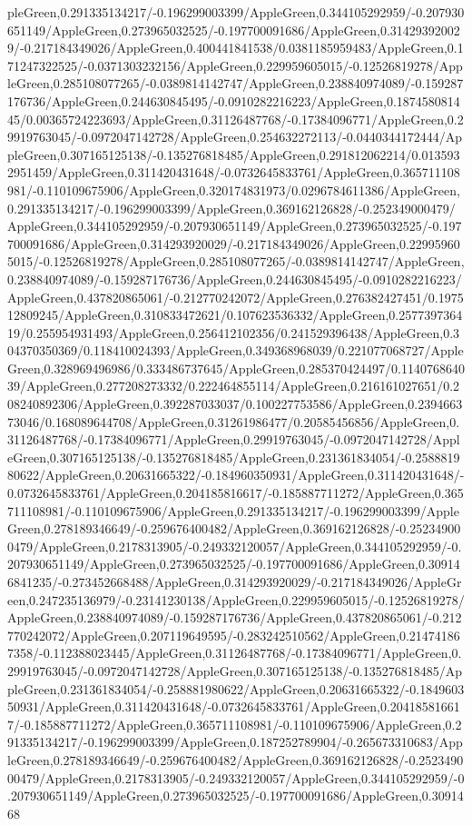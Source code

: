 {\begin{tikzternal}
{pleGreen,0.291335134217/-0.196299003399/AppleGreen,0.344105292959/-0.207930651149/AppleGreen,0.273965032525/-0.197700091686/AppleGreen,0.314293920029/-0.217184349026/AppleGreen,0.400441841538/0.0381185959483/AppleGreen,0.171247322525/-0.0371303232156/AppleGreen,0.229959605015/-0.12526819278/AppleGreen,0.285108077265/-0.0389814142747/AppleGreen,0.238840974089/-0.159287176736/AppleGreen,0.244630845495/-0.0910282216223/AppleGreen,0.187458081445/0.00365724223693/AppleGreen,0.31126487768/-0.17384096771/AppleGreen,0.29919763045/-0.0972047142728/AppleGreen,0.254632272113/-0.0440344172444/AppleGreen,0.307165125138/-0.135276818485/AppleGreen,0.291812062214/0.0135932951459/AppleGreen,0.311420431648/-0.0732645833761/AppleGreen,0.365711108981/-0.110109675906/AppleGreen,0.320174831973/0.0296784611386/AppleGreen,0.291335134217/-0.196299003399/AppleGreen,0.369162126828/-0.252349000479/AppleGreen,0.344105292959/-0.207930651149/AppleGreen,0.273965032525/-0.197700091686/AppleGreen,0.314293920029/-0.217184349026/AppleGreen,0.229959605015/-0.12526819278/AppleGreen,0.285108077265/-0.0389814142747/AppleGreen,0.238840974089/-0.159287176736/AppleGreen,0.244630845495/-0.0910282216223/AppleGreen,0.437820865061/-0.212770242072/AppleGreen,0.276382427451/0.197512809245/AppleGreen,0.310833472621/0.107623536332/AppleGreen,0.257739736419/0.255954931493/AppleGreen,0.256412102356/0.241529396438/AppleGreen,0.304370350369/0.118410024393/AppleGreen,0.349368968039/0.221077068727/AppleGreen,0.328969496986/0.333486737645/AppleGreen,0.285370424497/0.114076864039/AppleGreen,0.277208273332/0.222464855114/AppleGreen,0.216161027651/0.208240892306/AppleGreen,0.392287033037/0.100227753586/AppleGreen,0.239466373046/0.168089644708/AppleGreen,0.31261986477/0.20585456856/AppleGreen,0.31126487768/-0.17384096771/AppleGreen,0.29919763045/-0.0972047142728/AppleGreen,0.307165125138/-0.135276818485/AppleGreen,0.231361834054/-0.258881980622/AppleGreen,0.20631665322/-0.184960350931/AppleGreen,0.311420431648/-0.0732645833761/AppleGreen,0.204185816617/-0.185887711272/AppleGreen,0.365711108981/-0.110109675906/AppleGreen,0.291335134217/-0.196299003399/AppleGreen,0.278189346649/-0.259676400482/AppleGreen,0.369162126828/-0.252349000479/AppleGreen,0.2178313905/-0.249332120057/AppleGreen,0.344105292959/-0.207930651149/AppleGreen,0.273965032525/-0.197700091686/AppleGreen,0.309146841235/-0.273452668488/AppleGreen,0.314293920029/-0.217184349026/AppleGreen,0.247235136979/-0.23141230138/AppleGreen,0.229959605015/-0.12526819278/AppleGreen,0.238840974089/-0.159287176736/AppleGreen,0.437820865061/-0.212770242072/AppleGreen,0.207119649595/-0.283242510562/AppleGreen,0.214741867358/-0.112388023445/AppleGreen,0.31126487768/-0.17384096771/AppleGreen,0.29919763045/-0.0972047142728/AppleGreen,0.307165125138/-0.135276818485/AppleGreen,0.231361834054/-0.258881980622/AppleGreen,0.20631665322/-0.184960350931/AppleGreen,0.311420431648/-0.0732645833761/AppleGreen,0.204185816617/-0.185887711272/AppleGreen,0.365711108981/-0.110109675906/AppleGreen,0.291335134217/-0.196299003399/AppleGreen,0.187252789904/-0.265673310683/AppleGreen,0.278189346649/-0.259676400482/AppleGreen,0.369162126828/-0.252349000479/AppleGreen,0.2178313905/-0.249332120057/AppleGreen,0.344105292959/-0.207930651149/AppleGreen,0.273965032525/-0.197700091686/AppleGreen,0.3091468}
\end{tikzternal}}
